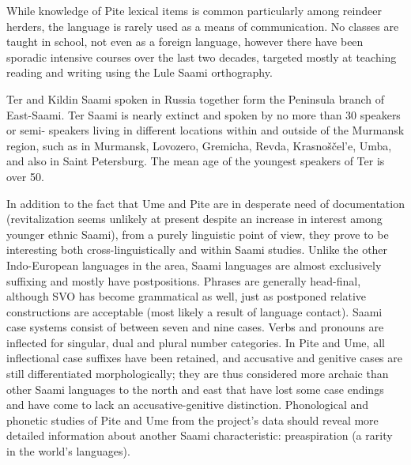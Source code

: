 \documentclass[a4paper,12pt]{article}
\begin{document}
While knowledge of Pite lexical items is common particularly among reindeer herders, the language is rarely used as a means of communication. No classes are taught in school, not even as a foreign language, however there have been sporadic intensive courses over the last two decades, targeted mostly at teaching reading and writing using the Lule Saami orthography.

Ter and Kildin Saami spoken in Russia together form the Peninsula branch of East-Saami. Ter Saami is nearly extinct and spoken by no more than 30 speakers or semi- speakers living in different locations within and outside of the Murmansk region, such as in Murmansk, Lovozero, Gremicha, Revda, Krasnoščel'e, Umba, and also in Saint Petersburg. The mean age of the youngest speakers of Ter is over 50.%

In addition to the fact that Ume and Pite are in desperate need of documentation (revitalization seems unlikely at present despite an increase in interest among younger ethnic Saami), from a purely linguistic point of view, they prove to be interesting both cross-linguistically and within Saami studies. Unlike the other Indo-European languages in the area, Saami languages are almost exclusively suffixing and mostly have postpositions. Phrases are generally head-final, although SVO has become grammatical as well, just as postponed relative constructions are acceptable (most likely a result of language contact). Saami case systems consist of between seven and nine cases. Verbs and pronouns are inflected for singular, dual and plural number categories. In Pite and Ume, all inflectional case suffixes have been retained, and accusative and genitive cases are still differentiated morphologically; they are thus considered more archaic than other Saami languages to the north and east that have lost some case endings and have come to lack an accusative-genitive distinction. Phonological and phonetic studies of Pite and Ume from the project's data should reveal more detailed information about another Saami characteristic: preaspiration (a rarity in the world's languages).
\end{document}
